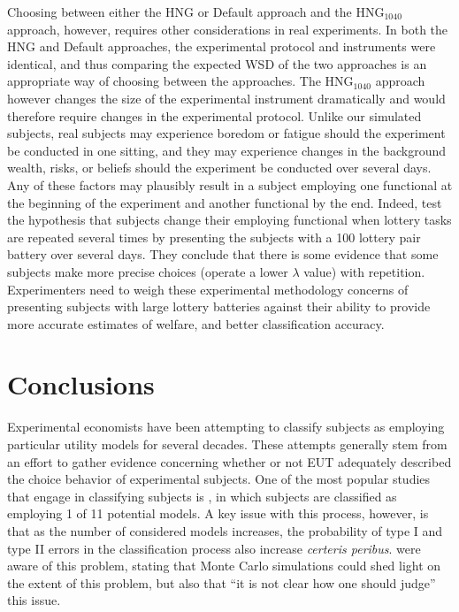 \documentclass[../main.tex]{subfiles}
\begin{document}
Choosing between either the HNG or Default approach and the $\text{HNG}_{1040}$ approach, however, requires other considerations in real experiments.
In both the HNG and Default approaches, the experimental protocol and instruments were identical, and thus comparing the expected WSD of the two approaches is an appropriate way of choosing between the approaches.
The $\text{HNG}_{1040}$ approach however changes the size of the experimental instrument dramatically and would therefore require changes in the experimental protocol.
Unlike our simulated subjects, real subjects may experience boredom or fatigue should the experiment be conducted in one sitting, and they may experience changes in the background wealth, risks, or beliefs should the experiment be conducted over several days.
Any of these factors may plausibly result in a subject employing one functional at the beginning of the experiment and another functional by the end.
Indeed, \textcite{Hey2001} test the hypothesis that subjects change their employing functional when lottery tasks are repeated several times by presenting the subjects with a 100 lottery pair battery over several days.
They conclude that there is some evidence that some subjects make more precise choices (operate a lower $\lambda$ value) with repetition.
Experimenters need to weigh these experimental methodology concerns of presenting subjects with large lottery batteries against their ability to provide more accurate estimates of welfare, and better classification accuracy.

\section{Conclusions}

Experimental economists have been attempting to classify subjects as employing particular utility models for several decades.
These attempts generally stem from an effort to gather evidence concerning whether or not EUT adequately described the choice behavior of experimental subjects.
One of the most popular studies that engage in classifying subjects is \textcite{Hey1994}, in which subjects are classified as employing 1 of 11 potential models.
A key issue with this process, however, is that as the number of considered models increases, the probability of type I and type II errors in the classification process also increase \textit{certeris peribus}.
\textcite[1314-1315]{Hey1994} were aware of this problem, stating that Monte Carlo simulations could shed light on the extent of this problem, but also that \enquote{it is not clear how one should judge} this issue.
\end{document}

